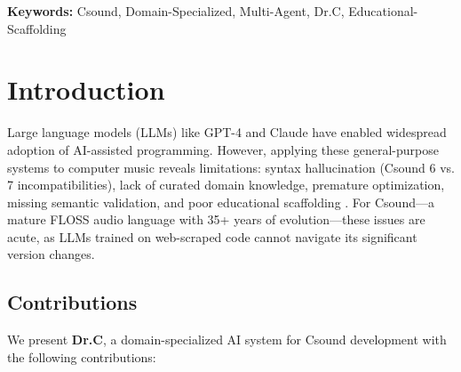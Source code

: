 \documentclass[a4paper]{article}
\title{\papertitle}
\newif\ifpdf
\begin{document}
\ifpdf
  \DeclareGraphicsExtensions{.png,.jpg,.pdf}
\else
\fi

\maketitle

\begin{abstract}
We present Dr.C, an open-source AI system specialized for Csound that addresses fundamental limitations in general-purpose AI coding assistants. Dr.C implements a domain-specialized architecture combining multi-agent orchestration, curated knowledge retrieval, semantic validation, and an alternatives-first design paradigm that positions the AI as collaborator rather than autonomous generator. Key contributions include Csound-aware structural patching, contract validation beyond syntax checking, multi-tier knowledge retrieval, and design tree exploration. Dr.C is freely available under MIT license as a template for building domain-specialized AI assistants for FLOSS audio development.
\end{abstract}

\textbf{Keywords:} Csound, Domain-Specialized, Multi-Agent, Dr.C, Educational-Scaffolding

\section{Introduction}
\label{sec:intro}

Large language models (LLMs) like GPT-4 and Claude have enabled widespread adoption of AI-assisted programming. However, applying these general-purpose systems to computer music reveals limitations: syntax hallucination (Csound 6 vs. 7 incompatibilities), lack of curated domain knowledge, premature optimization, missing semantic validation, and poor educational scaffolding \cite{boulanger2000csound}. For Csound—a mature FLOSS audio language with 35+ years of evolution—these issues are acute, as LLMs trained on web-scraped code cannot navigate its significant version changes.

\subsection{Contributions}

We present \textbf{Dr.C}, a domain-specialized AI system for Csound development with the following contributions:
\end{document}
